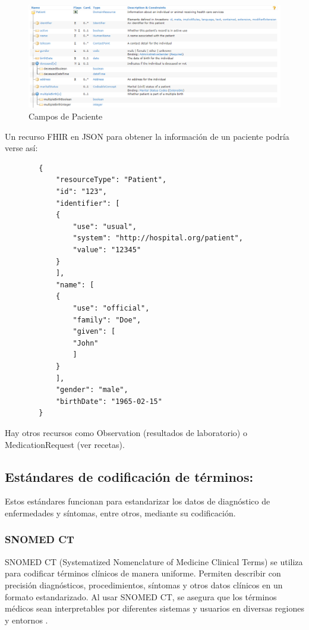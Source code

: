 \documentclass[12pt, a4paper, twoside]{article}
\begin{document}
	\begin{figure}[h!]
		\includegraphics[width=1\textwidth]{image/2.png}
		\caption{Campos de Paciente}
		\label{fig:2}
	\end{figure}
	
	
	Un recurso FHIR en JSON para obtener la información de un paciente podría verse así:
	
	\begin{verbatim}
		{
			"resourceType": "Patient",
			"id": "123",
			"identifier": [
			{
				"use": "usual",
				"system": "http://hospital.org/patient",
				"value": "12345"
			}
			],
			"name": [
			{
				"use": "official",
				"family": "Doe",
				"given": [
				"John"
				]
			}
			],
			"gender": "male",
			"birthDate": "1965-02-15"
		}
	\end{verbatim}
	
	Hay otros recursos como Observation (resultados de laboratorio) o MedicationRequest (ver recetas).
	
	\subsection{Estándares de codificación de términos:}
	
	Estos estándares funcionan para estandarizar los datos de diagnóstico de enfermedades y síntomas, entre otros, mediante su codificación.
	
	\subsubsection{SNOMED CT}
	
	SNOMED CT (Systematized Nomenclature of Medicine Clinical Terms) se utiliza para codificar términos clínicos de manera uniforme. Permiten describir con precisión diagnósticos, procedimientos, síntomas y otros datos clínicos en un formato estandarizado. Al usar SNOMED CT, se asegura que los términos médicos sean interpretables por diferentes sistemas y usuarios en diversas regiones y entornos \cite{sanidadSNOMEDCT}.
	
\end{document}
